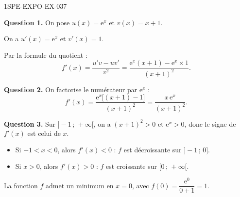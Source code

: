 \begin{corrige}{1SPE-EXPO-EX-037}

\textbf{Question 1.} On pose $u(x) = \mathrm{e}^{x}$ et $v(x) = x + 1$.

On a $u'(x) = \mathrm{e}^{x}$ et $v'(x) = 1$.

Par la formule du quotient :
\[f'(x) = \frac{u'v - uv'}{v^2} = \frac{\mathrm{e}^{x}(x+1) - \mathrm{e}^{x} \times 1}{(x+1)^2}.\]

\textbf{Question 2.} On factorise le numérateur par $\mathrm{e}^{x}$ :
\[f'(x) = \frac{\mathrm{e}^{x}\bigl[(x+1) - 1\bigr]}{(x+1)^2} = \boxed{\frac{x\,\mathrm{e}^{x}}{(x+1)^2}}.\]

\textbf{Question 3.} Sur $]-1\,;\,+\infty[$, on a $(x+1)^2 > 0$ et $\mathrm{e}^{x} > 0$, donc le signe de $f'(x)$ est celui de $x$.
\begin{itemize}
\item Si $-1 < x < 0$, alors $f'(x) < 0$ : $f$ est décroissante sur $]-1\,;\,0]$.
\item Si $x > 0$, alors $f'(x) > 0$ : $f$ est croissante sur $[0\,;\,+\infty[$.
\end{itemize}
La fonction $f$ admet un minimum en $x = 0$, avec $f(0) = \dfrac{\mathrm{e}^{0}}{0+1} = 1$.
\end{corrige}

